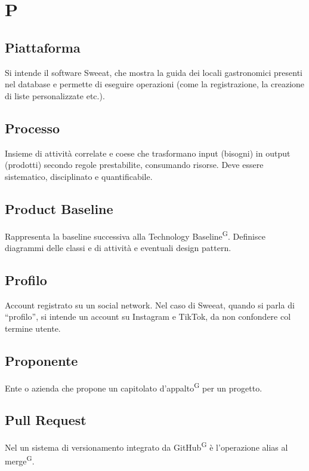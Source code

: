 \section{P}

\subsection{Piattaforma} Si intende il software Sweeat, che mostra la guida dei locali gastronomici presenti nel database e permette di eseguire operazioni (come la registrazione, la creazione di liste personalizzate etc.).

\subsection{Processo}
Insieme di attività correlate e coese che trasformano input (bisogni) in output (prodotti) secondo regole prestabilite, consumando risorse. Deve essere sistematico, disciplinato e quantificabile.

\subsection{Product Baseline}
Rappresenta la baseline successiva alla Technology Baseline\textsuperscript{G}. Definisce diagrammi delle classi e di attività e eventuali design pattern. 

\subsection{Profilo} Account registrato su un social network. Nel caso di Sweeat, quando si parla di “profilo”, si intende un account su Instagram e TikTok, da non confondere col termine utente.




\subsection{Proponente}
Ente o azienda che propone un capitolato d’appalto\textsuperscript{G} per un progetto.

\subsection{Pull Request}
Nel un sistema di versionamento integrato da GitHub\textsuperscript{G} è l'operazione alias al merge\textsuperscript{G}.

\clearpage